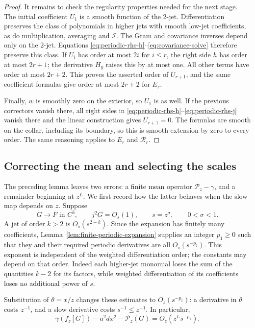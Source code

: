 \begin{proof}
It remains to check the regularity properties needed for the next stage.
The initial coefficient $U_1$ is a smooth function of the $2$-jet.
Differentiation preserves the class of polynomials in higher jets with
smooth low-jet coefficients, as do multiplication, averaging and
$\mathcal I$.  The Gram and covariance inverses depend only on the
$2$-jet.  Equations \eqref{eq:periodic-rhs-h}--\eqref{eq:covariance-solve}
therefore preserve this class.  If $U_i$ has order at most $2i$ for
$i\le r$, the right side $h$ has order at most $2r+1$; the derivative
$H_y$ raises this by at most one.  All other terms have order at most
$2r+2$.  This proves the asserted order of $U_{r+1}$, and the same
coefficient formulas give order at most $2r+2$ for $E_r$.

Finally, $w$ is smoothly zero on the exterior, so $U_1$ is as well.  If
the previous correctors vanish there, all right sides in
\eqref{eq:periodic-rhs-h}--\eqref{eq:periodic-rhs-j} vanish there and the
linear construction gives $U_{r+1}=0$.  The formulas are smooth on the
collar, including its boundary, so this is smooth extension by zero to
every order.  The same reasoning applies to $E_r$ and $\mathcal R_r$.
\end{proof}

\subsection{Correcting the mean and selecting the scales}

The preceding lemma leaves two errors: a finite mean operator
$\mathcal P_z-\gamma$, and a remainder beginning at $z^L$.  We first record
how the latter behaves when the slow map depends on $z$.
Suppose
\begin{equation}
 G\longrightarrow F\text{ in }C^3,
 \qquad j^2G=O_s(1),\qquad s=z^\sigma,
 \qquad 0<\sigma<1.
 \label{eq:slow-map-bounds}
\end{equation}
A jet of order $k>2$ is $O_s(s^{2-k})$.  Since the expansion has finitely
many coefficients, Lemma~\ref{lem:finite-periodic-expansion} supplies an
integer $p_1\ge0$ such that they and their required periodic derivatives
are all $O_s(s^{-p_1})$.  This exponent is independent of the weighted
differentiation order; the constants may depend on that order.  Indeed
each higher-jet monomial loses the sum of the quantities $k-2$ for its
factors, while weighted differentiation of its coefficients loses no
additional power of $s$.

Substitution of $\theta=x/z$ changes these estimates to $O_z(s^{-p_1})$:
a derivative in $\theta$ costs $z^{-1}$, and a slow derivative costs
$s^{-1}\le z^{-1}$.  In particular,
\begin{equation}
 \gamma(f_z[G])-a^2dx^2-\mathcal P_z(G)
       =O_z(z^Ls^{-p_1}).
 \label{eq:fast-remainder-bound}
\end{equation}


